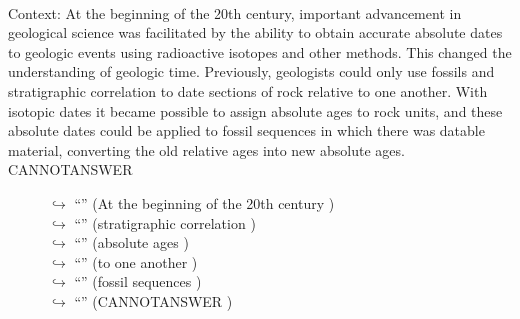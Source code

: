 \documentclass[11pt,a4paper, onecolumn]{article}
\begin{document}
\\ Context: At the beginning of the 20th century, important advancement in geological science was facilitated by the ability to obtain accurate absolute dates to geologic events using radioactive isotopes and other methods. This changed the understanding of geologic time. Previously, geologists could only use fossils and stratigraphic correlation to date sections of rock relative to one another. With isotopic dates it became possible to assign absolute ages to rock units, and these absolute dates could be applied to fossil sequences in which there was datable material, converting the old relative ages into new absolute ages. CANNOTANSWER

\begin{figure}[t] \small \begin{tcolorbox}[boxsep=0pt,left=5pt,right=0pt,top=2pt,colback = yellow!5] \begin{dialogue}
 \small 
\colorbox{pink!25}{$\hookrightarrow$}
{ ``'' (At the beginning of the 20th century ) }
\\
\colorbox{pink!25}{$\hookrightarrow$}
{ ``'' (stratigraphic correlation ) }
\\
\colorbox{pink!25}{$\hookrightarrow$}
{ ``'' (absolute ages ) }
\\
\colorbox{pink!25}{$\hookrightarrow$}
{ ``'' (to one another ) }
\\
\colorbox{pink!25}{$\hookrightarrow$}
{ ``'' (fossil sequences ) }
\\
\colorbox{pink!25}{$\hookrightarrow$}
{ ``'' (CANNOTANSWER ) }
\\

\end{dialogue}
\end{tcolorbox}
\end{figure}
\end{document}
